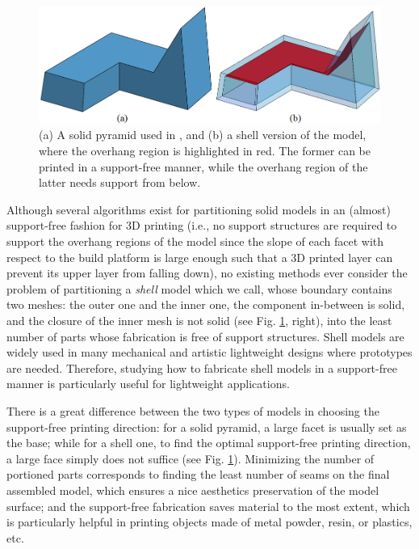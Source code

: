 \begin{figure}[t!]
  \centering
  \includegraphics[width=\linewidth]{figs/solid_hollow.png}
  \caption{\label{fig:solid_hollow}%
  (a) A solid pyramid used in \cite{Hu_siga14}, and (b) a shell version of the model, {where the overhang region is highlighted in red}. The former can be printed in a support-free manner, while the overhang region of the latter needs support from below.}
\end{figure}

Although several algorithms exist for partitioning solid models in an (almost) support-free fashion \cite{Hu_siga14} for 3D printing (i.e., no support structures are required to support the overhang regions of the model since the slope of each facet with respect to the build platform is large enough such that a 3D printed layer can prevent its upper layer from falling down), no existing methods ever consider the problem of partitioning a \emph{shell} model which we call, whose boundary contains two meshes: the outer one and the inner one, the component in-between is solid, and the closure of the inner mesh is not solid (see Fig. \ref{fig:solid_hollow}, right), into the least number of parts whose fabrication is free of support structures. Shell models are widely used in many mechanical and artistic lightweight designs where prototypes are needed. Therefore, studying how to fabricate shell models in a support-free manner is particularly useful for lightweight applications.



There is a great difference between the two types of models in choosing the support-free printing direction: for a solid pyramid, a large facet is usually set as the base; while for a shell one, to find the optimal support-free printing direction, a large face simply does not suffice (see Fig. \ref{fig:solid_hollow}). Minimizing the number of portioned parts corresponds to finding the least number of seams on the final assembled model, which ensures a nice aesthetics preservation of the model surface; and the support-free fabrication saves material to the most extent, which is particularly helpful in printing objects made of metal powder, resin, or plastics, etc.



